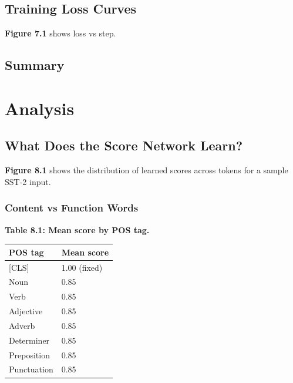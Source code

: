 {\subsection{Training Loss Curves}

\textbf{Figure 7.1} shows loss vs step.

\subsection{Summary}




\section{Analysis}

\subsection{What Does the Score Network Learn?}

\textbf{Figure 8.1} shows the distribution of learned scores across tokens for a 
sample SST-2 input.

\subsubsection{Content vs Function Words}

\textbf{Table 8.1: Mean score by POS tag.}

\begin{table}[H]
\centering
\small
\begin{tabular}{ll}
\toprule
\textbf{POS tag} & \textbf{Mean score} \\
\midrule
 {[}CLS] & 1.00 (fixed) \\
Noun & 0.85 \\
Verb & 0.85 \\
Adjective & 0.85 \\
Adverb & 0.85 \\
Determiner & 0.85 \\
Preposition & 0.85 \\
Punctuation & 0.85 \\
\bottomrule
\end{tabular}
\end{table}

}
